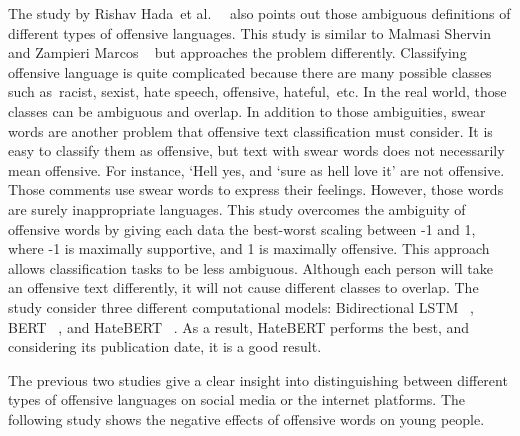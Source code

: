 \documentclass[11pt, natbib=false]{article}
\begin{document}
The study by Rishav Hada et al. ~\cite{hada2021ruddit} also points out those ambiguous definitions of different types of offensive languages.
This study is similar to Malmasi Shervin and Zampieri Marcos ~\cite{malmasi2017detecting} but approaches the problem differently.
Classifying offensive language is quite complicated because there are many possible classes such as racist, sexist, hate speech, offensive, hateful, etc. In the real world, those classes can be ambiguous and overlap.
In addition to those ambiguities, swear words are another problem that offensive text classification must consider.
It is easy to classify them as offensive, but text with swear words does not necessarily mean offensive.
For instance, ‘Hell yes, and ‘sure as hell love it’ are not offensive.
Those comments use swear words to express their feelings.
However, those words are surely inappropriate languages.
This study overcomes the ambiguity of offensive words by giving each data the best-worst scaling between -1 and 1, where -1 is maximally supportive, and 1 is maximally offensive.
This approach allows classification tasks to be less ambiguous.
Although each person will take an offensive text differently, it will not cause different classes to overlap.
The study consider three different computational models: Bidirectional LSTM ~\cite{pennington2014glove}, BERT ~\cite{devlin2018bert}, and HateBERT ~\cite{caselli2020hatebert}.
As a result, HateBERT performs the best, and considering its publication date, it is a good result. 

The previous two studies give a clear insight into distinguishing between different types of offensive languages on social media or the internet platforms.
The following study shows the negative effects of offensive words on young people.
\end{document}
